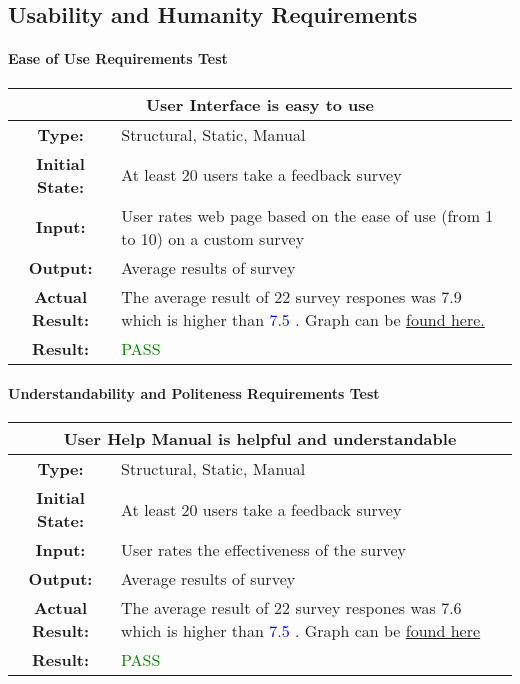 \documentclass[12pt, titlepage]{article}
\newcommand{\acceptableRating}{\textcolor{blue}{7.5 }}
\begin{document}
\subsection{Usability and Humanity Requirements}

\paragraph{Ease of Use Requirements Test}

\begin{center}
\begin{table}[H]
\begin{tabularx}{\textwidth}{| c X |}
\hline
\multicolumn{2}{|c|}{\textbf{User Interface is easy to use}}\\
\hline
\textbf{Type: } & Structural, Static, Manual\\
\textbf{Initial State: } & At least 20 users take a feedback survey\\
\textbf{Input: } & User rates web page based on the ease of use (from 1 to 10) on a custom survey\\
\textbf{Output: } & Average results of survey \\
\textbf{Actual Result:  } &  The average result of 22 survey respones was 7.9 which is higher than \acceptableRating. Graph can be \href{run:./NFR.PNG}{found here.} \\
\textbf{Result: } & \textcolor{green}{PASS}\\
\hline
\end{tabularx}
\end{table}
\end{center}

\paragraph{Understandability and Politeness Requirements Test}

\begin{center}
\begin{table}[H]
\begin{tabularx}{\textwidth}{| c X |}
\hline
\multicolumn{2}{|c|}{\textbf{User Help Manual is helpful and understandable}}\\
\hline
\textbf{Type: } & Structural, Static, Manual\\
\textbf{Initial State: } & At least 20 users take a feedback survey\\
\textbf{Input: } & User rates the effectiveness of the survey\\
\textbf{Output: } & Average results of survey \\
\textbf{Actual Result:  } &  The average result of 22 survey respones was 7.6 which is higher than \acceptableRating. Graph can be \href{run:./NFR4.PNG}{found here} \\
\textbf{Result: } & \textcolor{green}{PASS}\\
\hline
\end{tabularx}
\end{table}
\end{center}
\end{document}
